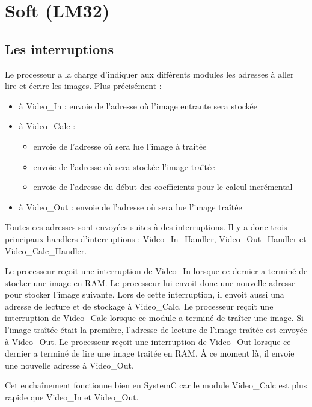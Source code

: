 {{    \section*{Soft (LM32)}


		\subsection*{Les interruptions}
{Le processeur a la charge d'indiquer aux différents modules les adresses à aller lire et écrire les images. Plus précisément :

\begin{itemize}
	\item à Video\_In : envoie de l'adresse où l'image entrante sera stockée
	\item à Video\_Calc : \begin{itemize}
								\item envoie de l'adresse où sera lue l'image à traitée
								\item envoie de l'adresse où sera stockée l'image traîtée
								\item envoie de l'adresse du début des coefficients pour le calcul incrémental
							\end{itemize}
	\item à Video\_Out : envoie de l'adresse où sera lue l'image traîtée
\end{itemize}

Toutes ces adresses sont envoyées suites à des interruptions.
Il y a donc trois principaux handlers d'interruptions : Video\_In\_Handler, Video\_Out\_Handler et Video\_Calc\_Handler.

Le processeur reçoit une interruption de Video\_In lorsque ce dernier a terminé de stocker une image en RAM. Le processeur lui envoit donc une nouvelle adresse pour stocker l'image suivante. Lors de cette interruption, il envoit aussi una adresse de lecture et de stockage à Video\_Calc.
Le processeur reçoit une interruption de Video\_Calc lorsque ce module a terminé de traîter une image. Si l'image traîtée était la première, l'adresse de lecture de l'image traîtée est envoyée à Video\_Out.
Le processeur reçoit une interruption de Video\_Out lorsque ce dernier a terminé de lire une image traitée en RAM. À ce moment là, il envoie une nouvelle adresse à Video\_Out.

Cet enchaînement fonctionne bien en SystemC car le module Video\_Calc est plus rapide que Video\_In et Video\_Out.

}}}
